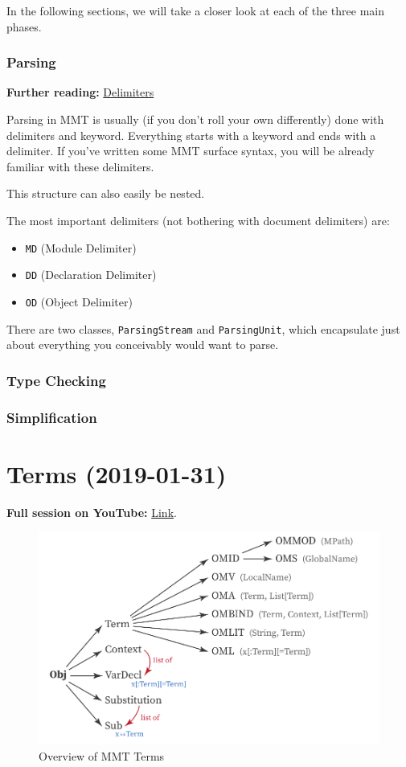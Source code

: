 \documentclass[11pt,a4paper]{article}
\newcommand{\MMT}{\textsf{MMT}\xspace}
\begin{document}
In the following sections, we will take a closer look at each of the three main phases.

\subsubsection{Parsing}

\textbf{Further reading:} \href{https://uniformal.github.io/doc/language/delimiters.html}{Delimiters}
\bigskip

Parsing in \MMT is usually (if you don't roll your own differently) done with delimiters and keyword. Everything starts with a keyword and ends with a delimiter. If you've written some \MMT surface syntax, you will be already familiar with these delimiters.

This structure can also easily be nested.

The most important delimiters (not bothering with document delimiters) are:

\begin{itemize}
\item \texttt{MD} (Module Delimiter)
\item \texttt{DD} (Declaration Delimiter)
\item \texttt{OD} (Object Delimiter)
\end{itemize}

There are two classes, \texttt{ParsingStream} and \texttt{ParsingUnit}, which encapsulate just about everything you conceivably would want to parse.
\subsubsection{Type Checking}
\subsubsection{Simplification}

\newpage
\section{Terms (2019-01-31)}
\label{sec:terms}

\textbf{Full session on YouTube:} \href{https://www.youtube.com/watch?v=vtePl2pGhfc}{Link}.
\bigskip

\begin{figure}[ht]
\includegraphics[scale=1]{mmt-terms.pdf}
\caption{Overview of \MMT Terms}
\label{fig:mmtterms}
\end{figure}
\end{document}
